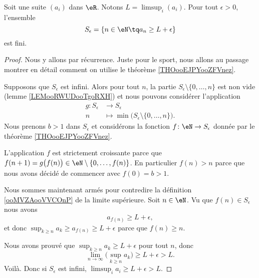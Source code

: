 \begin{lemma}       \label{LEMooHGJVooCbgOEK}
	Soit une suite \( (a_i)\) dans \( \eR\). Notons \( L= \limsup_i(a_i)\).
	Pour tout \( \epsilon>0\), l'ensemble
	\begin{equation}
		S_{\epsilon}=\{ n\in \eN\tq a_n\geq L+\epsilon \}
	\end{equation}
	est fini.
\end{lemma}

\begin{proof}
	Nous y allons par récurrence. Juste pour le sport, nous allons au passage montrer en détail comment on utilise le théorème \ref{THOooEJPYooZFVnez}.


	Supposons que \( S_{\epsilon}\) est infini. Alors pour tout \( n\), la partie \( S_{\epsilon}\setminus\{ 0,\ldots, n \}\) est non vide (lemme \ref{LEMooRWUDooTgoRXH}) et nous pouvons considérer l'application
	\begin{equation}
		\begin{aligned}
			g\colon S_{\epsilon} & \to S_{\epsilon}                                                \\
			n                    & \mapsto \min\big( S_{\epsilon}\setminus\{ 0,\ldots, n \} \big).
		\end{aligned}
	\end{equation}
	Nous prenons \( b>1\) dans \( S_{\epsilon}\) et considérons la fonction \( f\colon \eN\to S_{\epsilon}\) donnée par le théorème \ref{THOooEJPYooZFVnez}.

	L'application \( f\) est strictement croissante parce que \( f(n+1)=g\big( f(n) \big)\in \eN\setminus\{ 0,\ldots, f(n) \}\). En particulier \( f(n)>n\) parce que nous avons décidé de commencer avec \( f(0)=b>1\).

	Nous sommes maintenant armés pour contredire la définition \ref{ooMVZAooVVCOnP} de la limite supérieure. Soit \( n\in \eN\). Vu que \( f(n)\in S_{\epsilon}\) nous avons
	\begin{equation}
		a_{f(n)}\geq L+\epsilon,
	\end{equation}
	et donc \( \sup_{k\geq n}a_k\geq a_{f(n)}\geq L+\epsilon\) parce que \( f(n)\geq n\).

	Nous avons prouvé que \( \sup_{k\geq n}a_k\geq L+\epsilon\) pour tout \( n\), donc
	\begin{equation}
		\lim_{n\to \infty} \big( \sup_{k\geq n}a_k \big)\geq L+\epsilon>L.
	\end{equation}
	Voilà. Donc si \( S_{\epsilon}\) est infini, \( \limsup_ia_i\geq L+\epsilon>L\).
\end{proof}

